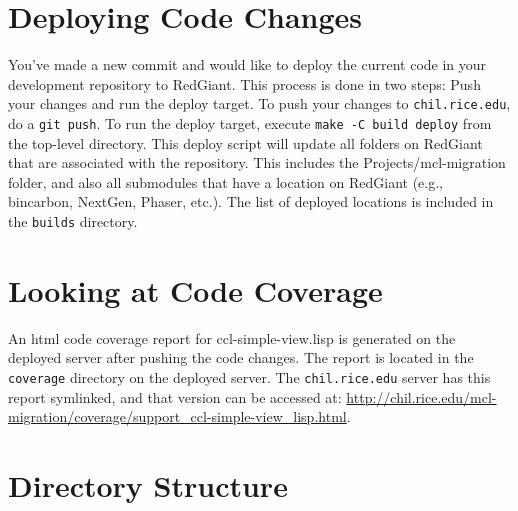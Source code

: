 \documentclass[12pt]{article} %
\newcommand{\code}[1]{\texttt{#1}}
\newcommand{\filesys}[1]{\texttt{#1}}
\begin{document}
\section{Deploying Code Changes}

You've made a new commit and would like to deploy the current code in your development repository to RedGiant.
This process is done in two steps: Push your changes and run the deploy target.
To push your changes to \filesys{chil.rice.edu}, do a \code{git push}.
To run the deploy target, execute \code{make -C build deploy} from the top-level directory.
This deploy script will update all folders on RedGiant that are associated with the repository.
This includes the Projects/mcl-migration folder, and also all submodules that have a location on RedGiant (e.g., bincarbon, NextGen, Phaser, etc.).
The list of deployed locations is included in the \filesys{builds} directory.

\section{Looking at Code Coverage}

An html code coverage report for ccl-simple-view.lisp is generated on the deployed server after pushing the code changes.
The report is located in the \filesys{coverage} directory on the deployed server.
The \filesys{chil.rice.edu} server has this report symlinked, and that version can be accessed at:
\url{http://chil.rice.edu/mcl-migration/coverage/support_ccl-simple-view_lisp.html}.

\section{Directory Structure} %
\end{document}
